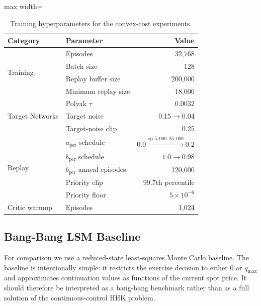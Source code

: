 \documentclass[a4paper,fleqn]{cas-dc}
\begin{document}
\begin{table}[htbp]
\centering
\caption{Training hyperparameters for the convex-cost experiments.}
\label{tab:hyperparams}
\begin{adjustbox}{max width=\linewidth}
\begin{tabular}{llr}
\toprule
Category & Parameter & Value \\
\midrule
\multirow{4}{*}{Training} & Episodes & 32{,}768 \\
 & Batch size & 128 \\
 & Replay buffer size & 200{,}000 \\
 & Minimum replay size & 18{,}000 \\
\midrule
\multirow{3}{*}{Target Networks} & Polyak $\tau$ & 0.0032 \\
 & Target noise & $0.15 \to 0.04$ \\
 & Target-noise clip & 0.25 \\
\midrule
\multirow{5}{*}{Replay} & $a_{\mathrm{per}}$ schedule & $0.0 \xrightarrow{\text{ep }5{,}000\text{--}25{,}000} 0.2$ \\
 & $b_{\mathrm{per}}$ schedule & $1.0 \to 0.98$ \\
 & $b_{\mathrm{per}}$ anneal episodes & 120{,}000 \\
 & Priority clip & 99.7th percentile \\
 & Priority floor & $5 \times 10^{-6}$ \\
\midrule
Critic warmup & Episodes & 1{,}024 \\
\bottomrule
\end{tabular}
\end{adjustbox}
\end{table}

\subsection{Bang-Bang LSM Baseline}
\label{sec:lsm}

For comparison we use a reduced-state least-squares Monte Carlo baseline. The baseline is intentionally simple: it restricts the exercise decision to either $0$ or $q_{\max}$ and approximates continuation values as functions of the current spot price. It should therefore be interpreted as a bang-bang benchmark rather than as a full solution of the continuous-control HHK problem.
\end{document}
